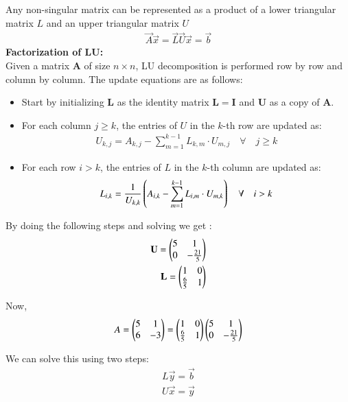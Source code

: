 \documentclass[journal]{IEEEtran}
\begin{document}
Any non-singular matrix can be represented as a product of a lower triangular matrix $L$ and an upper triangular matrix $U$
\begin{align}
	\vec{ A}\vec{x} = \vec{L}\vec{U}\vec{x} = \vec{b}
\end{align}
\textbf{Factorization of LU:}\\
Given a matrix $ \mathbf{A} $ of size $ n \times n $, LU decomposition is performed row by row and column by column. The update equations are as follows: 
\begin{itemize}
    \item Start by initializing $ \mathbf{L} $ as the identity matrix $ \mathbf{L} = \mathbf{I} $ and $ \mathbf{U} $ as a copy of $ \mathbf{A} $.\\
    \item For each column $ j \geq k $, the entries of $ U $ in the $ k $-th row are updated as:
    \begin{align}
        U_{k,j} = A_{k,j} - \sum_{m=1}^{k-1} L_{k,m} \cdot U_{m,j}\quad \forall \quad j \geq k
    \end{align}
    \item For each row $ i > k $, the entries of $ L $ in the $ k $-th column are updated as:
    \begin{align}
        L_{i,k} = \frac{1}{U_{k,k}} \left( A_{i,k} - \sum_{m=1}^{k-1} L_{i,m} \cdot U_{m,k}\right) \quad \forall \quad i > k
    \end{align}
\end{itemize}
By doing the following steps and solving we get :
\begin{align}
	\mathbf{U}=\begin{pmatrix}5 & 1\\0 & -\frac{21}{5}\end{pmatrix} \\
	\mathbf{ L} = \begin{pmatrix}1 & 0\\\frac{6}{5} & 1\end{pmatrix}
\end{align}

Now,
\begin{align}
    A = \begin{pmatrix}5 & 1\\6 & -3\end{pmatrix} = \begin{pmatrix}1 & 0\\\frac{6}{5} & 1\end{pmatrix}\begin{pmatrix}5 & 1\\0 & -\frac{21}{5}\end{pmatrix}
\end{align}

We can solve this using two steps:
\begin{align}
    L\vec{y} = \vec{b}\\
    U\vec{x} = \vec{y}
\end{align}
\end{document}
